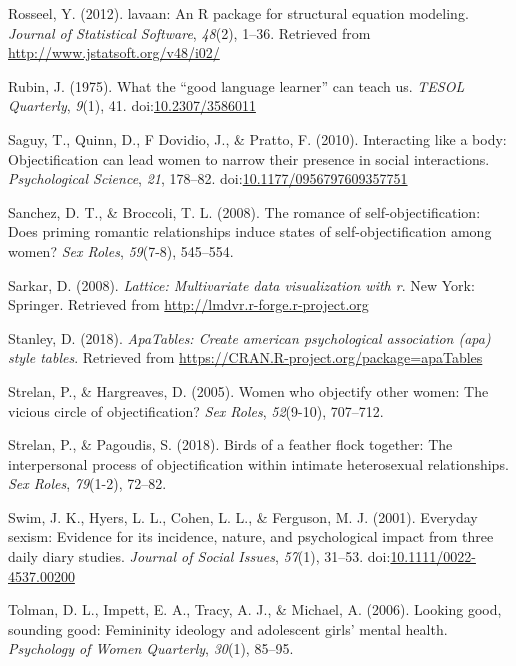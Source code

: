 \documentclass[man]{apa6}
\begin{document}
\hypertarget{ref-R-lavaan}{}
Rosseel, Y. (2012). lavaan: An R package for structural equation
modeling. \emph{Journal of Statistical Software}, \emph{48}(2), 1--36.
Retrieved from \url{http://www.jstatsoft.org/v48/i02/}

\hypertarget{ref-rubin1975}{}
Rubin, J. (1975). What the ``good language learner'' can teach us.
\emph{TESOL Quarterly}, \emph{9}(1), 41.
doi:\href{https://doi.org/10.2307/3586011}{10.2307/3586011}

\hypertarget{ref-saguyetal2010}{}
Saguy, T., Quinn, D., F Dovidio, J., \& Pratto, F. (2010). Interacting
like a body: Objectification can lead women to narrow their presence in
social interactions. \emph{Psychological Science}, \emph{21}, 178--82.
doi:\href{https://doi.org/10.1177/0956797609357751}{10.1177/0956797609357751}

\hypertarget{ref-sanchez2008romance}{}
Sanchez, D. T., \& Broccoli, T. L. (2008). The romance of
self-objectification: Does priming romantic relationships induce states
of self-objectification among women? \emph{Sex Roles}, \emph{59}(7-8),
545--554.

\hypertarget{ref-R-lattice}{}
Sarkar, D. (2008). \emph{Lattice: Multivariate data visualization with
r}. New York: Springer. Retrieved from
\url{http://lmdvr.r-forge.r-project.org}

\hypertarget{ref-R-apaTables}{}
Stanley, D. (2018). \emph{ApaTables: Create american psychological
association (apa) style tables}. Retrieved from
\url{https://CRAN.R-project.org/package=apaTables}

\hypertarget{ref-strelan2005women}{}
Strelan, P., \& Hargreaves, D. (2005). Women who objectify other women:
The vicious circle of objectification? \emph{Sex Roles},
\emph{52}(9-10), 707--712.

\hypertarget{ref-strelan2018birds}{}
Strelan, P., \& Pagoudis, S. (2018). Birds of a feather flock together:
The interpersonal process of objectification within intimate
heterosexual relationships. \emph{Sex Roles}, \emph{79}(1-2), 72--82.

\hypertarget{ref-swimetal}{}
Swim, J. K., Hyers, L. L., Cohen, L. L., \& Ferguson, M. J. (2001).
Everyday sexism: Evidence for its incidence, nature, and psychological
impact from three daily diary studies. \emph{Journal of Social Issues},
\emph{57}(1), 31--53.
doi:\href{https://doi.org/10.1111/0022-4537.00200}{10.1111/0022-4537.00200}

\hypertarget{ref-tolman2006looking}{}
Tolman, D. L., Impett, E. A., Tracy, A. J., \& Michael, A. (2006).
Looking good, sounding good: Femininity ideology and adolescent girls'
mental health. \emph{Psychology of Women Quarterly}, \emph{30}(1),
85--95.
\end{document}
